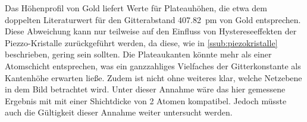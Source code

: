 Das Höhenprofil von Gold liefert Werte für Plateauhöhen, die etwa dem doppelten
Literaturwert für den Gitterabstand \SI{407.82}{\pico\meter} von Gold
entsprechen. Diese Abweichung kann nur teilweise auf den Einfluss von
Hystereseeffekten der Piezzo-Kristalle zurückgeführt werden, da diese, wie in
\ref{ssub:piezokristalle} beschrieben, gering sein sollten.
Die
Plateaukanten könnte mehr als einer Atomschicht entsprechen, was ein
ganzzahliges Vielfaches der Gitterkonstante als Kantenhöhe erwarten ließe.
Zudem ist nicht ohne weiteres klar, welche Netzebene in dem Bild betrachtet
wird.
Unter dieser Annahme wäre das hier gemessene Ergebnis mit mit einer Shichtdicke
von \num{2} Atomen kompatibel. Jedoch müsste auch die Gültigkeit dieser Annahme
weiter untersucht werden.
